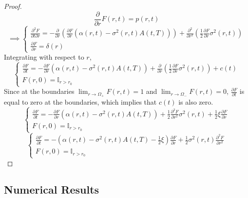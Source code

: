 \documentclass[12pt]{article}
\theoremstyle{definition}
\theoremstyle{remark}
\begin{document}
\begin{proof}
\[\frac{\partial}{\partial r} F(r, t)=p(r, t)\]
\begin{equation*} \implies \left \{\begin{array}{rl} \frac{\partial^2 F}{\partial t \partial r}=-\frac{\partial }{\partial r} \left( \frac{\partial F}{\partial r}\left(\alpha(r, t)-\sigma^2(r, t)A(t, T)\right) \right)+\frac{\partial ^2}{\partial r^2} \left( \frac{1}{2}\frac{\partial F}{\partial r}\sigma^2 (r, t) \right)\\
 \frac{\partial F}{\partial r} =\delta(r)
\end{array}
\right.
\end{equation*}
Integrating with respect to \(r\), 
\begin{equation*} \left \{\begin{array}{rl} \frac{\partial F}{\partial t}=- \frac{\partial F}{\partial r}\left(\alpha(r, t)-\sigma^2(r, t)A(t, T)\right)+\frac{\partial }{\partial r} \left( \frac{1}{2}\frac{\partial F}{\partial r}\sigma^2 (r, t) \right) +c(t) \\
F(r, 0)=\mathbb{I}_{r>r_0}
\end{array}
\right.
\end{equation*}
Since at the boundaries \(\lim_{r\to \Omega _{+}} F(r, t)=1\) and \(\lim_{r \to \Omega _{-}} F(r, t)=0\), \(\frac{\partial F}{\partial t}\) is equal to zero at the boundaries, which implies that \(c(t)\) is also zero.
\begin{equation*} \left \{\begin{array}{rl} \frac{\partial F}{\partial t}=- \frac{\partial F}{\partial r}\left(\alpha(r, t)-\sigma^2(r, t)A(t, T)\right)+ \frac{1}{2}\frac{\partial ^2  F}{\partial r^2}\sigma^2 (r, t) +\frac{1}{2}\xi \frac{\partial F}{\partial r} \\
F(r, 0)=\mathbb{I}_{r>r_0}
\end{array}
\right.
\end{equation*}
\begin{equation*} \left \{ \begin{array}{rl} 
\frac{\partial F}{\partial t}=-\left(\alpha(r, t)-\sigma^2(r, t)A(t, T)-\frac{1}{2} \xi \right) \frac{\partial F}{\partial r} +\frac{1}{2} \sigma^2 (r, t) \frac{\partial^2 F}{\partial r^2} \\
F(r, 0)=\mathbb{I}_{r>r_0}
\end{array} 
\right.
\end{equation*}
\end{proof}
\subsection{Numerical Results}
\end{document}
